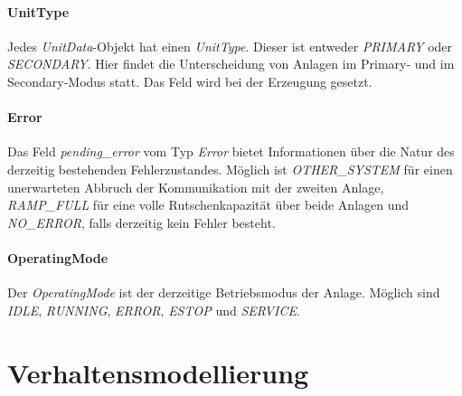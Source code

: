 \paragraph{UnitType}
Jedes \textit{UnitData}-Objekt hat einen \textit{UnitType}. Dieser ist entweder \textit{PRIMARY} oder
\textit{SECONDARY}.
Hier findet die Unterscheidung von Anlagen im Primary- und im Secondary-Modus statt.
Das Feld wird bei der Erzeugung gesetzt.

\paragraph{Error}
Das Feld \textit{pending_error} vom Typ \textit{Error} bietet Informationen über die Natur des derzeitig
bestehenden Fehlerzustandes. Möglich ist \textit{OTHER_SYSTEM} für einen unerwarteten Abbruch der Kommunikation
mit der zweiten Anlage, \textit{RAMP_FULL} für eine volle Rutschenkapazität über beide Anlagen und \textit{NO_ERROR},
falls derzeitig kein Fehler besteht.

\paragraph{OperatingMode}
Der \textit{OperatingMode} ist der derzeitige Betriebsmodus der Anlage.
Möglich sind \textit{IDLE}, \textit{RUNNING}, \textit{ERROR}, \textit{ESTOP} und \textit{SERVICE}.






\FloatBarrier
\section{Verhaltensmodellierung}\label{sec:verhaltensmodellierung}

